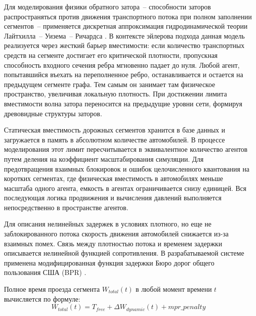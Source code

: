 Для моделирования физики обратного затора~-- способности заторов распространяться против движения транспортного потока при полном заполнении сегментов~-- применяется дискретная аппроксимация гидродинамической теории Лайтхилла~-- Уизема~-- Ричардса \cite{duret2017traffic, richards1956shock}. В контексте эйлерова подхода данная модель реализуется через жесткий барьер вместимости: если количество транспортных средств на сегменте достигает его критической плотности, пропускная способность входного сечения ребра мгновенно падает до нуля. Любой агент, попытавшийся въехать на переполненное ребро, останавливается и остается на предыдущем сегменте графа. Тем самым он занимает там физическое пространство, увеличивая локальную плотность. При достижении лимита вместимости волна затора переносится на предыдущие уровни сети, формируя древовидные структуры заторов.

Статическая вместимость дорожных сегментов хранится в базе данных и загружается в память в абсолютном количестве автомобилей. В процессе моделирования этот лимит пересчитывается в эквивалентное количество агентов путем деления на коэффициент масштабирования симуляции. Для предотвращения взаимных блокировок и ошибок целочисленного квантования на коротких сегментах, где физическая вместимость в автомобилях меньше масштаба одного агента, емкость в агентах ограничивается снизу единицей. Вся последующая логика продвижения и вычисления давлений выполняется непосредственно в пространстве агентов.\label{sec:agent-space}


Для описания нелинейных задержек в условиях плотного, но еще не заблокированного потока скорость движения автомобилей снижается из-за взаимных помех. Связь между плотностью потока и временем задержки описывается нелинейной функцией сопротивления. В разрабатываемой системе применена модифицированная функция задержки Бюро дорог общего пользования США (BPR) \cite{gore2023modified}.


Полное время проезда сегмента $W_{total}(t)$ в любой момент времени $t$ вычисляется по формуле:
\begin{equation}\label{eq:w_total}
    W_{total}(t) = T_{free} + \Delta W_{dynamic}(t) + \mathit{mpr\_penalty}
\end{equation}

